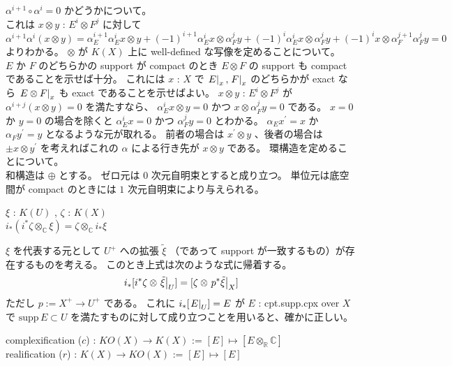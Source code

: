 \begin{Proof}
\itemprof
  \(\alpha^{i+1} \circ \alpha^{i} = 0\) かどうかについて。 \\
  これは \(x \otimes y\) : \(E^i \otimes F^j\) に対して \(\alpha^{i+1} \alpha^i (x \otimes y) = \alpha_E^{i+1} \alpha_E^{i} x \otimes y + (-1)^{i+1} \alpha_E^{i} x \otimes \alpha_F^{j} y + (-1)^{i} \alpha_E^i x \otimes \alpha_F^j y + (-1)^i x \otimes \alpha_F^{j+1} \alpha_F^{j} y = 0\) よりわかる。
\itemprof
  \(\otimes\) が \(K(X)\) 上に well-defined な写像を定めることについて。 \\
  \(E\) か \(F\) のどちらかの support が compact のとき \(E \otimes F\) の support も compact であることを示せば十分。
  これには \(x\) : \(X\) で \(\left. {E} \right| _{x} , \left. {F} \right| _{x}\) のどちらかが exact なら \(\left. {E \otimes F} \right| _{x}\) も exact であることを示せばよい。
  \(x \otimes y\) : \(E^i \otimes F^j\) が \(\alpha^{i+j} (x \otimes y) = 0\) を満たすなら、 \(\alpha_E^i x \otimes y = 0\) かつ \(x \otimes \alpha_F^j y = 0\) である。
  \(x = 0\) か \(y = 0\) の場合を除くと \(\alpha_E^i x = 0\) かつ \(\alpha_F^j y = 0\) とわかる。
  \(\alpha_E x^\prime = x\) か \(\alpha_F y^\prime = y\) となるような元が取れる。
  前者の場合は \(x^\prime \otimes y\) 、後者の場合は \(\pm x \otimes y^\prime\) を考えればこれの \(\alpha\) による行き先が \(x \otimes y\) である。
\itemprof
  環構造を定めることについて。 \\
  和構造は \(\oplus\) とする。
  ゼロ元は \(0\) 次元自明束とすると成り立つ。
  単位元は底空間が compact のときには \(1\) 次元自明束により与えられる。
\end{Proof}

\begin{Theorem}[(1) の式]
\itemprop
  \For \(\xi\) : \(K(U)\) , \(\zeta\) : \(K(X)\) \\
  \Then \(i_*(i^* \zeta \otimes_{\mathbb{C}} \xi) = \zeta \otimes_{\mathbb{C}} i_* \xi\)
\end{Theorem}

\begin{Proof}
\itemprof
  \(\xi\) を代表する元として \(U^+\) への拡張 \(\tilde{\xi}\) （であって support が一致するもの）が存在するものを考える。
  このとき上式は次のような式に帰着する。
  \[
    i_* [i^* \zeta \otimes \left. {\tilde{\xi}} \right| _{U}] = [\zeta \otimes \left. {p^* \tilde{\xi}} \right| _{X}]
  \]
  ただし \(p := X^+ \to U^+\) である。
  これに \(i_*[\left. {E} \right| _{U}] = E\) が \(E\) : cpt.supp.cpx over \(X\) で \(\text{supp} \, E \subset U\) を満たすものに対して成り立つことを用いると、確かに正しい。
\end{Proof}

\begin{Definition}
\itemdefi
  complexification (\(c\)) : \(KO(X) \to K(X)\) := \([E] \mapsto [E \otimes_{\mathbb{R}} \mathbb{C}]\) \\
  realification (\(r\)) : \(K(X) \to KO(X)\) := \([E] \mapsto [E]\)
\end{Definition}